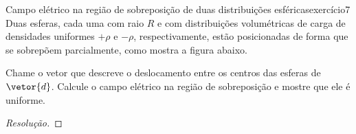\begin{exercício}{Campo elétrico na região de sobreposição de duas distribuições esféricas}{exercício7}
    Duas esferas, cada uma com raio \(R\) e com distribuições volumétricas de carga de densidades uniformes \(+\rho\) e \(-\rho\), respectivamente, estão posicionadas de forma que se sobrepõem parcialmente, como mostra a figura abaixo.
    \begin{center}
    \end{center}
    Chame o vetor que descreve o deslocamento entre os centros das esferas de \(\vetor{d}\). Calcule o campo elétrico na região de sobreposição e mostre que ele é uniforme.
\end{exercício}
\begin{proof}[Resolução]

\end{proof}
